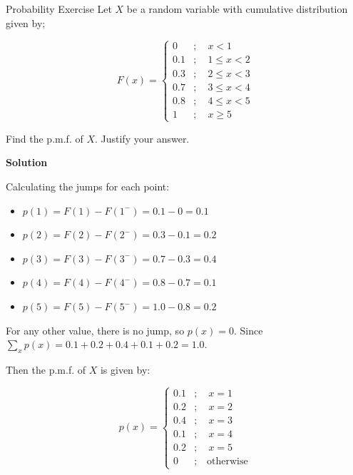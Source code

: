 \documentclass[12pt, a4paper]{article}
\begin{document}
\thispagestyle{fancy}

\begin{exercisebox}{Probability Exercise}
Let $X$ be a random variable with cumulative distribution given by;

$$
F(x) = \begin{cases} 
0 & ; \quad x < 1 \\
0.1 & ; \quad 1 \leq x < 2 \\
0.3 & ; \quad 2 \leq x < 3 \\
0.7 & ; \quad 3 \leq x < 4 \\
0.8 & ; \quad 4 \leq x < 5 \\
1 & ; \quad x \geq 5 
\end{cases}
$$

Find the p.m.f. of $X$. Justify your answer.
\end{exercisebox}

\textbf{Solution}

Calculating the jumps for each point:
\begin{itemize}
    \item $p(1) = F(1) - F(1^-) = 0.1 - 0 = 0.1$
    \item $p(2) = F(2) - F(2^-) = 0.3 - 0.1 = 0.2$
    \item $p(3) = F(3) - F(3^-) = 0.7 - 0.3 = 0.4$
    \item $p(4) = F(4) - F(4^-) = 0.8 - 0.7 = 0.1$
    \item $p(5) = F(5) - F(5^-) = 1.0 - 0.8 = 0.2$
\end{itemize}

For any other value, there is no jump, so $p(x) = 0$. Since $\sum_{x} p(x) = 0.1 + 0.2 + 0.4 + 0.1 + 0.2 = 1.0$.

Then the p.m.f. of $X$ is given by:

$$
p(x) = \begin{cases} 
0.1 & ; \quad x = 1 \\
0.2 & ; \quad x = 2 \\
0.4 & ; \quad x = 3 \\
0.1 & ; \quad x = 4 \\
0.2 & ; \quad x = 5 \\
0   & ; \quad \text{otherwise}
\end{cases}
$$
\end{document}
